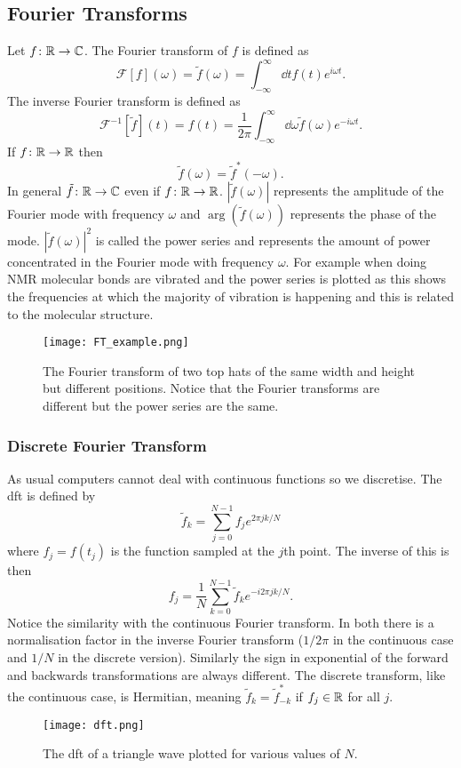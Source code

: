 \documentclass[a4paper]{article}
\newcommand{\FT}{\mathcal{F}}
\begin{document}
    \subsection{Fourier Transforms}
    Let \(f\colon\mathbb{R}\to\mathbb{C}\).
    The Fourier transform of \(f\) is defined as
    \[\FT[f](\omega) = \tilde{f}(\omega) = \int_{-\infty}^{\infty} \dd{t} f(t)e^{i\omega t}.\]
    The inverse Fourier transform is defined as
    \[\FT^{-1}[\tilde{f}](t) = f(t) = \frac{1}{2\pi} \int_{-\infty}^{\infty} \dd{\omega} \tilde{f}(\omega) e^{-i\omega t}.\]
    If \(f\colon\mathbb{R}\to\mathbb{R}\) then
    \[\tilde{f}(\omega) = \tilde{f}^*(-\omega).\]
    In general \(\tilde{f}\colon\mathbb{R}\to\mathbb{C}\) even if \(f\colon\mathbb{R}\to\mathbb{R}\).
    \(|\tilde{f}(\omega)|\) represents the amplitude of the Fourier mode with frequency \(\omega\) and \(\arg(\tilde{f}(\omega))\) represents the phase of the mode.
    \(|\tilde{f}(\omega)|^2\) is called the power series and represents the amount of power concentrated in the Fourier mode with frequency \(\omega\).
    For example when doing NMR molecular bonds are vibrated and the power series is plotted as this shows the frequencies at which the majority of vibration is happening and this is related to the molecular structure.
    \begin{figure}[ht]
        \centering
        \texttt{[image: FT\_example.png]}
        \caption{The Fourier transform of two top hats of the same width and height but different positions. Notice that the Fourier transforms are different but the power series are the same.}
        \label{fig:FT example}
    \end{figure}

    \subsubsection{Discrete Fourier Transform}
    As usual computers cannot deal with continuous functions so we discretise.
    The \acrfull{dft} is defined by
    \[\tilde{f}_k = \sum_{j=0}^{N-1} f_je^{2\pi jk/N}\]
    where \(f_j = f(t_j)\) is the function sampled at the \(j\)th point.
    The inverse of this is then
    \[f_j = \frac{1}{N}\sum_{k=0}^{N-1}\tilde{f}_ke^{-i2\pi jk/N}.\]
    Notice the similarity with the continuous Fourier transform.
    In both there is a normalisation factor in the inverse Fourier transform (\(1/2\pi\) in the continuous case and \(1/N\) in the discrete version).
    Similarly the sign in exponential of the forward and backwards transformations are always different.
    The discrete transform, like the continuous case, is Hermitian, meaning \(\tilde{f}_k = \tilde{f}_{-k}^*\) if \(f_j\in\mathbb{R}\) for all \(j\).
    \begin{figure}[ht]
        \centering
        \texttt{[image: dft.png]}
        \caption{The \gls{dft} of a triangle wave plotted for various values of \(N\).}
    \end{figure}
\end{document}
